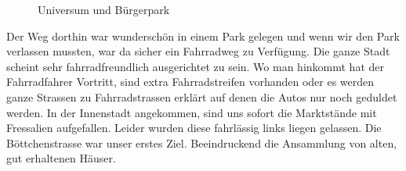 \begin{figure}[H]
   \centering
   \quad
   \quad
   \caption[Universum und Bürgerpark]{Universum und Bürgerpark}
\end{figure}

Der Weg dorthin war wunderschön in einem Park gelegen und wenn wir den Park verlassen mussten, war da sicher ein Fahrradweg zu Verfügung.
Die ganze Stadt scheint sehr fahrradfreundlich ausgerichtet zu sein.
Wo man hinkommt hat der Fahrradfahrer Vortritt, sind extra Fahrradstreifen vorhanden oder es werden ganze Strassen zu Fahrradstrassen erklärt auf denen die Autos nur noch geduldet werden.
In der Innenstadt angekommen, sind uns sofort die Marktstände mit Fressalien aufgefallen. Leider wurden diese fahrlässig links liegen gelassen.
Die Böttchenstrasse war unser erstes Ziel. Beeindruckend die Ansammlung von alten, gut erhaltenen Häuser.

